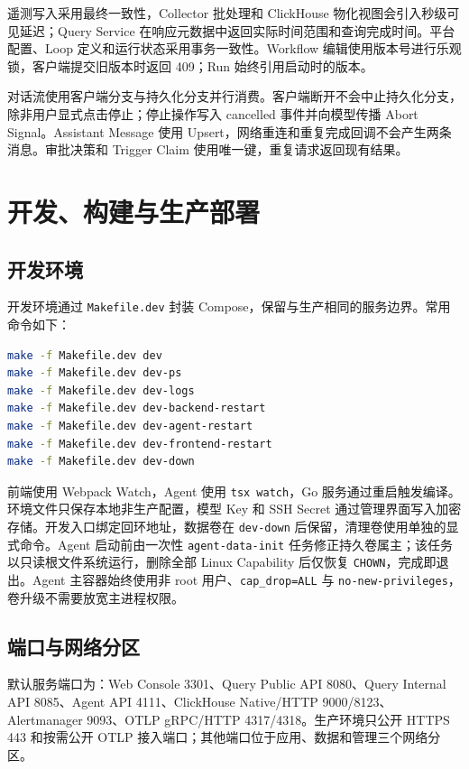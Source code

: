 \documentclass[conference,10pt]{IEEEtran}
\newcommand{\code}[1]{\texttt{#1}}
\begin{document}
遥测写入采用最终一致性，Collector 批处理和 ClickHouse 物化视图会引入秒级可见延迟；Query Service 在响应元数据中返回实际时间范围和查询完成时间。平台配置、Loop 定义和运行状态采用事务一致性。Workflow 编辑使用版本号进行乐观锁，客户端提交旧版本时返回 409；Run 始终引用启动时的版本。

对话流使用客户端分支与持久化分支并行消费。客户端断开不会中止持久化分支，除非用户显式点击停止；停止操作写入 cancelled 事件并向模型传播 Abort Signal。Assistant Message 使用 Upsert，网络重连和重复完成回调不会产生两条消息。审批决策和 Trigger Claim 使用唯一键，重复请求返回现有结果。

\section{开发、构建与生产部署}

\subsection{开发环境}

开发环境通过 \code{Makefile.dev} 封装 Compose，保留与生产相同的服务边界。常用命令如下：

\begin{lstlisting}[language=bash]
make -f Makefile.dev dev
make -f Makefile.dev dev-ps
make -f Makefile.dev dev-logs
make -f Makefile.dev dev-backend-restart
make -f Makefile.dev dev-agent-restart
make -f Makefile.dev dev-frontend-restart
make -f Makefile.dev dev-down
\end{lstlisting}

前端使用 Webpack Watch，Agent 使用 \code{tsx watch}，Go 服务通过重启触发编译。环境文件只保存本地非生产配置，模型 Key 和 SSH Secret 通过管理界面写入加密存储。开发入口绑定回环地址，数据卷在 \code{dev-down} 后保留，清理卷使用单独的显式命令。Agent 启动前由一次性 \code{agent-data-init} 任务修正持久卷属主；该任务以只读根文件系统运行，删除全部 Linux Capability 后仅恢复 \code{CHOWN}，完成即退出。Agent 主容器始终使用非 root 用户、\code{cap\_drop=ALL} 与 \code{no-new-privileges}，卷升级不需要放宽主进程权限。

\subsection{端口与网络分区}

默认服务端口为：Web Console 3301、Query Public API 8080、Query Internal API 8085、Agent API 4111、ClickHouse Native/HTTP 9000/8123、Alertmanager 9093、OTLP gRPC/HTTP 4317/4318。生产环境只公开 HTTPS 443 和按需公开 OTLP 接入端口；其他端口位于应用、数据和管理三个网络分区。
\end{document}
